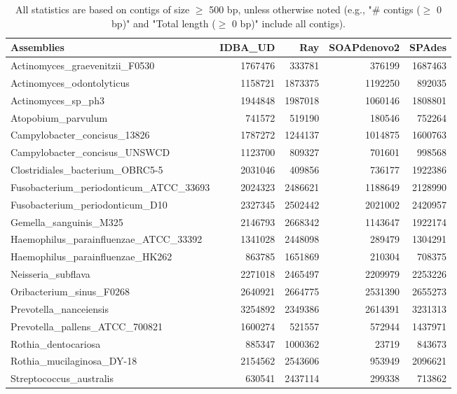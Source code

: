 \documentclass[12pt,a4paper]{article}
\begin{document}
\begin{table}[ht]
\begin{center}
\caption{All statistics are based on contigs of size $\geq$ 500 bp, unless otherwise noted (e.g., "\# contigs ($\geq$ 0 bp)" and "Total length ($\geq$ 0 bp)" include all contigs).}
\begin{tabular}{|l*{4}{|r}|}
\hline
Assemblies & IDBA\_UD & Ray & SOAPdenovo2 & SPAdes \\ \hline
Actinomyces\_graevenitzii\_F0530 & 1767476 & 333781 & 376199 & 1687463 \\ \hline
Actinomyces\_odontolyticus & 1158721 & 1873375 & 1192250 & 892035 \\ \hline
Actinomyces\_sp\_ph3 & 1944848 & 1987018 & 1060146 & 1808801 \\ \hline
Atopobium\_parvulum & 741572 & 519190 & 180546 & 752264 \\ \hline
Campylobacter\_concisus\_13826 & 1787272 & 1244137 & 1014875 & 1600763 \\ \hline
Campylobacter\_concisus\_UNSWCD & 1123700 & 809327 & 701601 & 998568 \\ \hline
Clostridiales\_bacterium\_OBRC5-5 & 2031046 & 409856 & 736177 & 1922386 \\ \hline
Fusobacterium\_periodonticum\_ATCC\_33693 & 2024323 & 2486621 & 1188649 & 2128990 \\ \hline
Fusobacterium\_periodonticum\_D10 & 2327345 & 2502442 & 2021002 & 2420957 \\ \hline
Gemella\_sanguinis\_M325 & 2146793 & 2668342 & 1143647 & 1922174 \\ \hline
Haemophilus\_parainfluenzae\_ATCC\_33392 & 1341028 & 2448098 & 289479 & 1304291 \\ \hline
Haemophilus\_parainfluenzae\_HK262 & 863785 & 1651869 & 210304 & 708375 \\ \hline
Neisseria\_subflava & 2271018 & 2465497 & 2209979 & 2253226 \\ \hline
Oribacterium\_sinus\_F0268 & 2640921 & 2664775 & 2531390 & 2655273 \\ \hline
Prevotella\_nanceiensis & 3254892 & 2349386 & 2614391 & 3231313 \\ \hline
Prevotella\_pallens\_ATCC\_700821 & 1600274 & 521557 & 572944 & 1437971 \\ \hline
Rothia\_dentocariosa & 885347 & 1000362 & 23719 & 843673 \\ \hline
Rothia\_mucilaginosa\_DY-18 & 2154562 & 2543606 & 953949 & 2096621 \\ \hline
Streptococcus\_australis & 630541 & 2437114 & 299338 & 713862 \\ \hline

\end{tabular}
\end{center}
\end{table}
\end{document}
